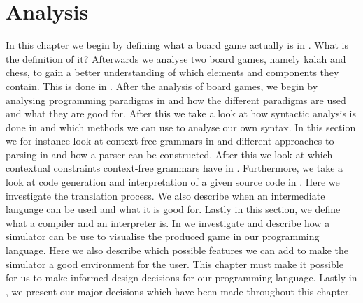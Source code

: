 \chapter{Analysis}
\label{chap:analysis}

In this chapter we begin by defining what a board game actually is in
. What is the definition of it? Afterwards we
analyse two board games, namely kalah and chess, to gain a better understanding
of which elements and components they contain. This is done in
. After the analysis of board games, we begin by analysing programming paradigms
in  and how the different paradigms are used and what they
are good for. After this we take a look at how syntactic analysis is done in
 and which methods we can use to analyse our own
syntax. In this section we for instance look at context-free grammars in and
different approaches to parsing in and how a parser can be constructed. After
this we look at which contextual constraints context-free grammars have in
. Furthermore, we take a look at code generation and interpretation of a given
source code in . Here we investigate
the translation process. We also describe when an intermediate language can be
used and what it is good for. Lastly in this section, we define what a compiler
and an interpreter is. In  we investigate and describe how a simulator can be use
to visualise the produced game in our programming language. Here we also
describe which possible features we can add to make the simulator a good
environment for the user. This chapter must make it possible for us to make informed design decisions for
our programming language. Lastly in , we present
our major decisions which have been made throughout this chapter.









